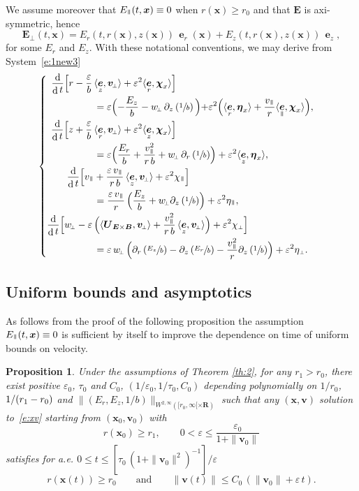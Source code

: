 \documentclass[10pt]{amsart}
\newenvironment{splitcases}
{\begin{cases}\begin{aligned}}
{\end{aligned}\end{cases}}
\newcommand{\sperp}{{\scriptscriptstyle\perp}}
\let\eps\varepsilon
\let\d\partial
\DeclareMathOperator\dD{d}\let\dd\dD
\theoremstyle{plain}
\newtheorem{proposition}[theorem]{Proposition}
\theoremstyle{definition}
\newcommand{\be}{\begin{equation}}
\newcommand{\ee}{\end{equation}}
\newcommand{\bpr}{\begin{proposition}}
\newcommand{\epr}{\end{proposition}}
\newcommand\R{\mathbf R}
\newcommand\bB{{\boldsymbol B}}
\newcommand\bE{{\boldsymbol E}}
\newcommand\bU{{\boldsymbol U}}
\newcommand\bfv{{\boldsymbol v}}
\newcommand\bfx{{\boldsymbol x}}
\newcommand\bfeta{{\boldsymbol \eta}}
\newcommand\bfchi{{\boldsymbol \chi}}
\DeclareMathOperator{\beD}{\boldsymbol{e}}
\newcommand\eDr{\beD_r}
\newcommand\eDz{\beD_z}
\newcommand\eDpar{\beD_\mypar}
\newcommand\vpar{v_\mypar}
\newcommand\bvperp{\bfv_{\!\sperp}}
\newcommand\eperp{w_{\!\sperp}}
\newcommand\Epar{E_\mypar}
\newcommand\Eperp{\bE_{\!\sperp}}
\newcommand\Er{E_r}
\newcommand\Ez{E_z}
\newcommand{\EcB}{\bU_{\bE\times\bB}}
\newcommand{\mypar}{{\mkern3mu\vphantom{\perp}\vrule depth 0pt\mkern2mu\vrule depth 0pt\mkern3mu}}
\begin{document}
We assume moreover that $\Epar(t,\bfx)\equiv 0$ when $r(\bfx)\geq r_0$ and that $\bE$ is axi-symmetric, hence
\[
\Eperp(t,\bfx)=\Er(t,r(\bfx),z(\bfx))\,\eDr(\bfx)+\Ez(t,r(\bfx),z(\bfx))\,\eDz,
\]
for some $\Er$ and $\Ez$. With these notational conventions, we may derive from System~\eqref{e:1new3}
\be
\label{e:rzve}
\begin{splitcases}
\frac{\dD}{\dD t}\Bigl[r
-\frac{\eps}{b}\,&\langle\eDz,\bvperp\rangle
+\eps^2\langle\eDr,\bfchi_x\rangle\Bigr]\\
&=
\eps\Bigl(-\frac{\Ez}{b}-\eperp\,\d_z\left(\sfrac1b\right)\Bigl)
+\eps^2\Bigl(\langle\eDr,\bfeta_x\rangle+\frac{\vpar}{r}\langle\eDpar,\bfchi_x\rangle\Bigr),\\
\frac{\dD}{\dD t}\Bigl[z
+\frac{\eps}{b}\,&\langle\eDr,\bvperp\rangle
+\eps^2\langle\eDz,\bfchi_x\rangle\Bigr]\\
&=
\eps\Bigl(\frac{\Er}{b}+\frac{\vpar^2}{r\,b}
+\eperp\,\d_r\left(\sfrac1b\right)\Bigr)
+\eps^2\langle\eDz,\bfeta_x\rangle,\\
\frac{\dD }{\dD t}\Bigl[\vpar
&+\frac{\eps\,\vpar}{r\,b}
\,\langle\eDz,\bvperp\rangle
+\eps^2\chi_\mypar\Bigr]\\
&=
\frac{\eps\,\vpar}{r}\,\Bigl(\frac{\Ez}{b}
+\eperp\d_z\left(\sfrac1b\right)\Bigr)+\eps^2\eta_\mypar,\\
\frac{\dD }{\dD t}\Bigl[\eperp
-\eps\,
&\Bigl(\langle\EcB,\bvperp\rangle
+\frac{\vpar^2}{r\,b}
\,\langle\eDz,\bvperp\rangle
\Bigr)
+\eps^2\chi_\sperp\Bigr]\\
&=
\eps\,\eperp\,
\Bigl(\d_r\left(\sfrac{\Ez}{b}\right)-\d_z\left(\sfrac{\Er}{b}\right)
-\frac{\vpar^2}{r}\d_z\left(\sfrac1b\right)\Bigr)
+\eps^2\eta_\sperp.
\end{splitcases}
\ee

\subsection{Uniform bounds and asymptotics}

As follows from the proof of the following proposition the assumption $\Epar(t,\bfx)\equiv 0$ is sufficient by itself to improve the dependence on time of uniform bounds on velocity.

\bpr
Under the assumptions of Theorem \ref{th:2}, for any $r_1>r_0$, there exist positive $\eps_0$, $\tau_0$ and $C_0$, $(1/\eps_0,1/\tau_0,C_0)$ depending polynomially on $1/r_0$, $1/(r_1-\nobreak r_0)$ and $\|(\Er,\Ez,1/b)\|_{W^{2,\infty}([r_0,\infty[\times\R)}$ such that any $(\bfx,\bfv)$ solution to~\eqref{e:xv} starting from $(\bfx_0,\bfv_0)$ with
\[
r(\bfx_0)\geq r_1,\qquad
0<\eps\leq \frac{\eps_0}{1+\|\bfv_0\|}
\]
satisfies for a.e. $0\leq t\leq[\tau_0\,(1+\|\bfv_0\|^2)^{-1}]/\eps$
\[
r(\bfx(t))\geq r_0\qquad\textrm{and}\qquad
\|\bfv(t)\|\leq C_0\,(\|\bfv_0\|+\eps\,t).
\]
\epr
\end{document}
